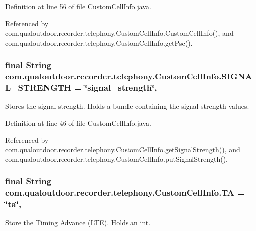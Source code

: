 Definition at line 56 of file Custom\-Cell\-Info.\-java.



Referenced by com.\-qualoutdoor.\-recorder.\-telephony.\-Custom\-Cell\-Info.\-Custom\-Cell\-Info(), and com.\-qualoutdoor.\-recorder.\-telephony.\-Custom\-Cell\-Info.\-get\-Psc().

\hypertarget{classcom_1_1qualoutdoor_1_1recorder_1_1telephony_1_1CustomCellInfo_a1dbe98f06e11635cd0158322456b3057}{
\subsubsection[{S\-I\-G\-N\-A\-L\-\_\-\-S\-T\-R\-E\-N\-G\-T\-H}]{\setlength{\rightskip}{0pt plus 5cm}final String com.\-qualoutdoor.\-recorder.\-telephony.\-Custom\-Cell\-Info.\-S\-I\-G\-N\-A\-L\-\_\-\-S\-T\-R\-E\-N\-G\-T\-H = \char`\"{}signal\-\_\-strength\char`\"{}\hspace{0.3cm}{\ttfamily [static]}, {\ttfamily [private]}}}\label{classcom_1_1qualoutdoor_1_1recorder_1_1telephony_1_1CustomCellInfo_a1dbe98f06e11635cd0158322456b3057}
Stores the signal strength. Holds a bundle containing the signal strength values. 

Definition at line 46 of file Custom\-Cell\-Info.\-java.



Referenced by com.\-qualoutdoor.\-recorder.\-telephony.\-Custom\-Cell\-Info.\-get\-Signal\-Strength(), and com.\-qualoutdoor.\-recorder.\-telephony.\-Custom\-Cell\-Info.\-put\-Signal\-Strength().

\hypertarget{classcom_1_1qualoutdoor_1_1recorder_1_1telephony_1_1CustomCellInfo_a87dd7521694de75516af18a053fd2701}{
\subsubsection[{T\-A}]{\setlength{\rightskip}{0pt plus 5cm}final String com.\-qualoutdoor.\-recorder.\-telephony.\-Custom\-Cell\-Info.\-T\-A = \char`\"{}ta\char`\"{}\hspace{0.3cm}{\ttfamily [static]}, {\ttfamily [private]}}}\label{classcom_1_1qualoutdoor_1_1recorder_1_1telephony_1_1CustomCellInfo_a87dd7521694de75516af18a053fd2701}
Store the Timing Advance (L\-T\-E). Holds an int. 

